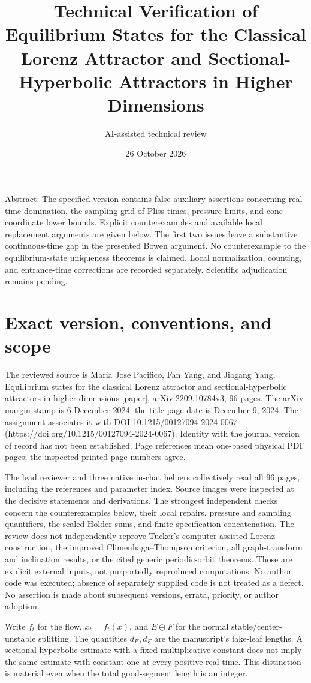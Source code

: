 \documentclass[10pt]{article}
\title{Technical Verification of
Equilibrium States for the Classical Lorenz Attractor
and Sectional-Hyperbolic Attractors in Higher Dimensions}
\author{AI-assisted technical review}
\date{26 October 2026}
\begin{document}
\maketitle
Abstract: The specified version contains false auxiliary assertions concerning real-time domination, the sampling grid of Pliss times, pressure limits, and cone-coordinate lower bounds. Explicit counterexamples and available local replacement arguments are given below. The first two issues leave a substantive continuous-time gap in the presented Bowen argument. No counterexample to the equilibrium-state uniqueness theorems is claimed. Local normalization, counting, and entrance-time corrections are recorded separately. Scientific adjudication remains pending.\par
\section*{Exact version, conventions, and scope}
The reviewed source is Maria Jose Pacifico, Fan Yang, and Jiagang Yang, Equilibrium states for the classical Lorenz attractor and sectional-hyperbolic attractors in higher dimensions [paper], arXiv:2209.10784v3, 96 pages. The arXiv margin stamp is 6 December 2024; the title-page date is December 9, 2024. The assignment associates it with DOI 10.1215/00127094-2024-0067 (https://doi.org/10.1215/00127094-2024-0067). Identity with the journal version of record has not been established. Page references mean one-based physical PDF pages; the inspected printed page numbers agree.\par
The lead reviewer and three native in-chat helpers collectively read all 96 pages, including the references and parameter index. Source images were inspected at the decisive statements and derivations. The strongest independent checks concern the counterexamples below, their local repairs, pressure and sampling quantifiers, the scaled Hölder sums, and finite specification concatenation. The review does not independently reprove Tucker’s computer-assisted Lorenz construction, the improved Climenhaga–Thompson criterion, all graph-transform and inclination results, or the cited generic periodic-orbit theorems. Those are explicit external inputs, not purportedly reproduced computations. No author code was executed; absence of separately supplied code is not treated as a defect. No assertion is made about subsequent versions, errata, priority, or author adoption.\par
Write \(f_t\) for the flow, \(x_t=f_t(x)\), and \(E\oplus F\) for the normal stable/center-unstable splitting. The quantities \(d_E,d_F\) are the manuscript’s fake-leaf lengths. A sectional-hyperbolic estimate with a fixed multiplicative constant does not imply the same estimate with constant one at every positive real time. This distinction is material even when the total good-segment length is an integer.\par
\end{document}
